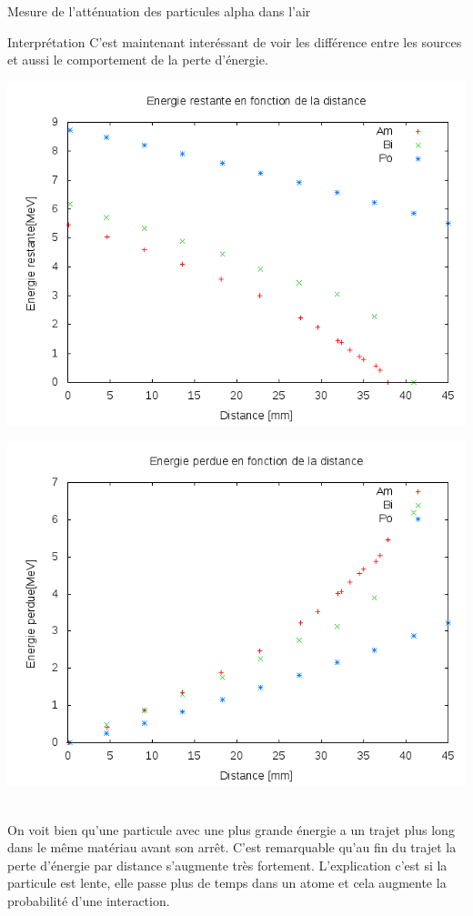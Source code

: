 \documentclass[a4paper,11pt,liststotocnumbered,bibtotocnumbered]{scrartcl}
\begin{document}
\begin{section}{Mesure de l'atténuation des particules alpha dans l'air}
  \begin{subsection}{Interprétation}
   C'est maintenant interéssant de voir les différence entre les sources et aussi le comportement de la perte d'énergie.\\
   \begin{minipage}{0.45\textwidth}
    \includegraphics[width=\textwidth]{Sabine/alle.png}
   \end{minipage}
   \hfill
   \begin{minipage}{0.45\textwidth}
    \includegraphics[width=\textwidth]{Sabine/alle_perte.png}
   \end{minipage} \\

   On voit bien qu'une particule avec une plus grande énergie a un trajet plus long dans le même matériau avant son arrêt. C'est remarquable qu'au fin du trajet la perte d'énergie par distance s'augmente très fortement. L'explication c'est si la particule est lente, elle passe plus de temps dans un atome et cela augmente la probabilité d'une interaction.  
  \end{subsection}
 \end{section}
\end{document}
